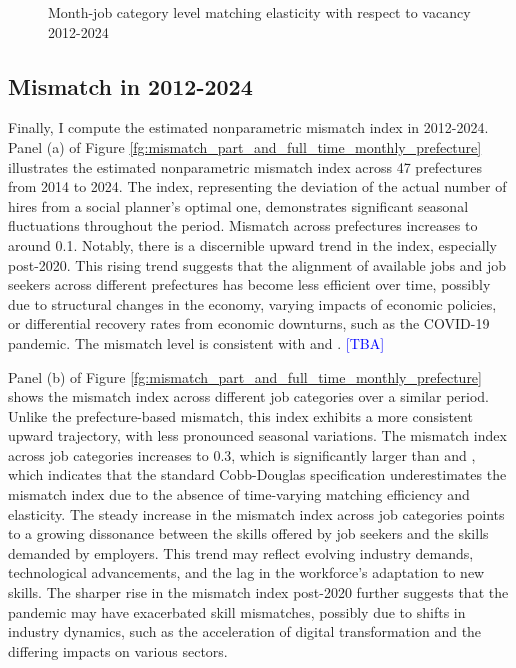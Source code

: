 \documentclass[12pt]{article}
\begin{document}
\begin{figure}[!ht]
\begin{center}
  \caption{Month-job category level matching elasticity with respect to vacancy 2012-2024}
  \label{fg:month_part_and_full_time_elasticity_vacancy_month_aggregate_job_category_results} 
  \end{center}
  \footnotesize
\end{figure} 


\subsection{Mismatch in 2012-2024}

Finally, I compute the estimated nonparametric mismatch index in 2012-2024.
Panel (a) of Figure \ref{fg:mismatch_part_and_full_time_monthly_prefecture} illustrates the estimated nonparametric mismatch index across 47 prefectures from 2014 to 2024. The index, representing the deviation of the actual number of hires from a social planner's optimal one, demonstrates significant seasonal fluctuations throughout the period.
Mismatch across prefectures increases to around 0.1.
Notably, there is a discernible upward trend in the index, especially post-2020. This rising trend suggests that the alignment of available jobs and job seekers across different prefectures has become less efficient over time, possibly due to structural changes in the economy, varying impacts of economic policies, or differential recovery rates from economic downturns, such as the COVID-19 pandemic.
The mismatch level is consistent with \cite{shibata2020labor} and \cite{higashi2023did}. \textcolor{blue}{[TBA]}

Panel (b) of Figure \ref{fg:mismatch_part_and_full_time_monthly_prefecture} shows the mismatch index across different job categories over a similar period. Unlike the prefecture-based mismatch, this index exhibits a more consistent upward trajectory, with less pronounced seasonal variations. 
The mismatch index across job categories increases to 0.3, which is significantly larger than \cite{shibata2020labor} and \cite{higashi2023did}, which indicates that the standard Cobb-Douglas specification underestimates the mismatch index due to the absence of time-varying matching efficiency and elasticity.
The steady increase in the mismatch index across job categories points to a growing dissonance between the skills offered by job seekers and the skills demanded by employers. This trend may reflect evolving industry demands, technological advancements, and the lag in the workforce's adaptation to new skills. The sharper rise in the mismatch index post-2020 further suggests that the pandemic may have exacerbated skill mismatches, possibly due to shifts in industry dynamics, such as the acceleration of digital transformation and the differing impacts on various sectors.
\end{document}
